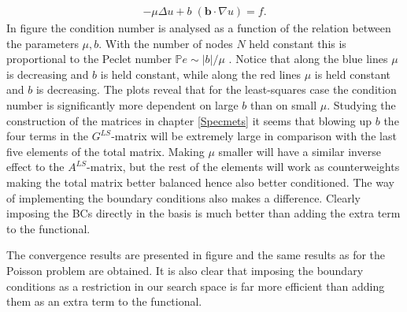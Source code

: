\begin{align}
	-\mu \Delta u + b \; (\mathbf{b} \cdot \nabla u) = f .
	\label{eq:difftransForConditionNumberPlotting}
\end{align}
%
In figure the condition number is analysed as a function of the relation between the parameters $\mu,b$. With the number of nodes $N$ held constant this is proportional to the Peclet number $\mathbb{P}e \sim |b|/\mu$ \cite{Quarteroni}. Notice that along the blue lines $\mu$ is decreasing and $b$ is held constant, while along the red lines $\mu$ is held constant and $b$ is decreasing. The plots reveal that for the least-squares case the condition number is significantly more dependent on large $b$ than on small $\mu$. Studying the construction of the matrices in chapter \ref{Specmets} it seems that blowing up $b$ the four terms in the $G^{LS}$-matrix will be extremely large in comparison with the last five elements of the total matrix. Making $\mu$ smaller will have a similar inverse effect to the $A^{LS}$-matrix, but the rest of the elements will work as counterweights making the total matrix better balanced hence also better conditioned. The way of implementing the boundary conditions also makes a difference. Clearly imposing the BCs directly in the basis is much better than adding the extra term to the functional.    

The convergence results are presented in figure and the same results as for the Poisson problem are obtained. It is also clear that imposing the boundary conditions as a restriction in our search space is far more efficient than adding them as an extra term to the functional. 

